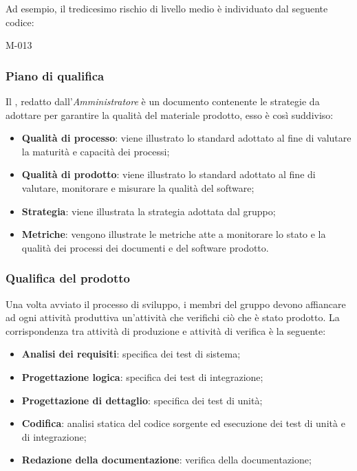 Ad esempio, il tredicesimo rischio di livello medio è individuato dal seguente codice:
\begin{center}
M-013
\end{center}

\subsubsection{Piano di qualifica}
Il \PdQ, redatto dall'\textit{Amministratore} è un documento contenente le strategie
da adottare per garantire la qualità del materiale prodotto, esso è così suddiviso:
\begin{itemize}
	\item \textbf{Qualità di processo}: viene illustrato lo standard adottato al fine di valutare la maturità e capacità dei processi;
	\item \textbf{Qualità di prodotto}: viene illustrato lo standard adottato al fine di valutare, monitorare e misurare la qualità del software;
	\item \textbf{Strategia}: viene illustrata la strategia adottata dal gruppo;	
	\item \textbf{Metriche}: vengono illustrate le metriche atte a monitorare lo stato e la qualità dei processi dei documenti e del software prodotto.
\end{itemize}

\subsubsection{Qualifica del prodotto}
Una volta avviato il processo di sviluppo, i membri del gruppo devono affiancare ad ogni attività produttiva un’attività che verifichi ciò che è stato prodotto. La corrispondenza tra attività di produzione e attività di verifica è la seguente:
\begin{itemize}
\item \textbf{Analisi dei requisiti}: specifica dei test di sistema;
\item \textbf{Progettazione logica}: specifica dei test di integrazione;
\item \textbf{Progettazione di dettaglio}: specifica dei test di unità;
\item \textbf{Codifica}: analisi statica del codice sorgente ed esecuzione dei test di unità e di integrazione;
\item \textbf{Redazione della documentazione}: verifica della documentazione;
\end{itemize}


